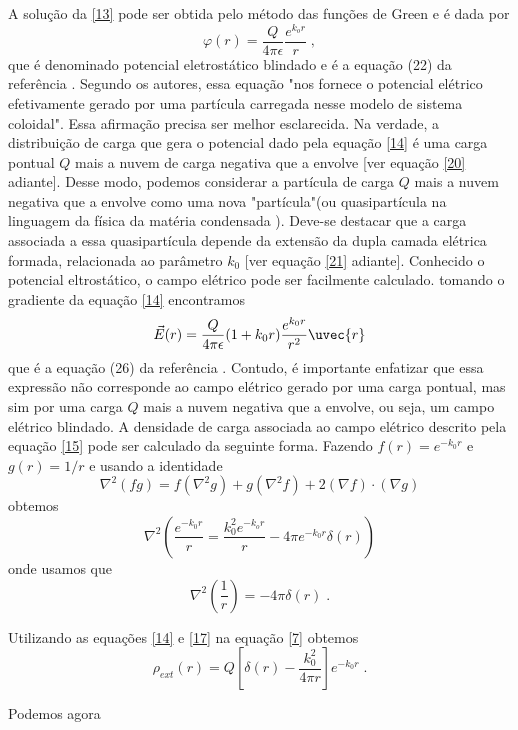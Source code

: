 \documentclass[brazilian,10.7pt,a4paper]{article}
\begin{document}
\begin{multicols}{2}
\par A solução da \eqref{13} pode ser obtida pelo método das funções de Green e é dada por 
\\
\begin{equation}\label{14}
\varphi(r)=\frac{Q}{4\pi\epsilon}\frac{e^{k_{o}r}}{r}\;,
\end{equation}
que é denominado potencial eletrostático blindado e é a equação (22) da referência \cite{ramos}. Segundo os autores, essa equação "nos fornece o potencial elétrico efetivamente gerado por uma partícula carregada nesse modelo de sistema coloidal". Essa afirmação precisa ser melhor esclarecida. Na verdade, a distribuição de carga que gera o potencial dado pela equação \eqref{14} é uma carga pontual $Q$ mais a nuvem de carga negativa que a envolve [ver equação \eqref{20} adiante]. Desse modo, podemos considerar a partícula de carga $Q$ mais a nuvem negativa que a envolve como uma nova "partícula"(ou quasipartícula na linguagem da física da matéria condensada \cite{ribeiro}). Deve-se destacar que a carga associada a essa quasipartícula depende da extensão da dupla camada elétrica formada, relacionada ao parâmetro $k_{0}$ [ver equação \eqref{21} adiante]. Conhecido o potencial eltrostático, o campo elétrico pode ser facilmente calculado. tomando o gradiente da equação \eqref{14} encontramos
\\
\begin{equation}\label{15}
\vec{E}(r)=\frac{Q}{4\pi\epsilon}(1+k_{0}r)\frac{e^{k_{0}r}}{r^{2}}\uvec{r}
\end{equation}
que é a equação (26) da referência \cite{ramos}. Contudo, é importante enfatizar que essa expressão não corresponde ao campo elétrico gerado por uma carga pontual, mas sim por uma carga $Q$ mais a nuvem negativa que a envolve, ou seja, um campo elétrico blindado. A densidade de carga associada ao campo elétrico descrito pela equação \eqref{15} pode ser calculado da seguinte forma. Fazendo $f(r)=e^{-k_{0}r}$ e $g(r) = 1/r$ e usando a identidade
\\
\begin{equation}\label{16}
\nabla^{2}(fg)=f(\nabla^{2}g)+g(\nabla^{2}f)+2(\nabla f)\cdot(\nabla g)
\end{equation}
obtemos
\\
\begin{equation}\label{17}
\nabla^{2}(\frac{e^{-k_{0}r}}{r}=\frac{k^{2}_{0}e^{-k_{o}r}}{r}-4\pi e^{-k_{0}r}\delta(r))
\end{equation}
onde usamos que
\\
\begin{equation}\label{18}
\nabla^{2}(\frac{1}{r})=-4\pi\delta(r)\;.
\end{equation}
\par Utilizando as equações \eqref{14} e \eqref{17} na equação \eqref{7} obtemos
\\
\begin{equation}\label{19}
\rho_{ext}(r)=Q[\delta(r)-\frac{k^{2}_{0}}{4\pi r}]e^{-k_{0}r}\;.
\end{equation}
\par Podemos agora


\end{multicols}
\end{document}
